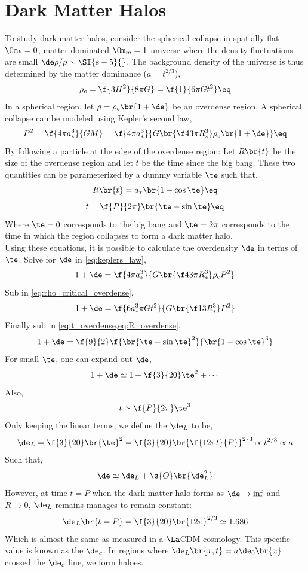 \documentclass{article}
\begin{document}
\section{Dark Matter Halos}
To study dark matter halos, consider the spherical collapse in spatially flat $\Om_k = 0$, matter dominated $\Om_m = 1$ universe where the density fluctuations are small $\de \rho / \rho \sim \SI{e-5}{}$. The background density of the universe is thus determined by the matter dominance ($a = t^{2/3}$),
\[ \rho_c = \f{3 H^2}{8 \pi G} = \f{1}{6 \pi G t^2} \eq \label{eq:rho_critical_overdense}\]
In a spherical region, let $\rho = \rho_c \br{1 + \de}$ be an overdense region. A spherical collapse can be modeled using Kepler's second law,
\[ P^2  = \f{4 \pi a_{*}^3}{GM} = \f{4 \pi a_{*}^3}{G \br{\f43 \pi R_{*}^3} \rho_{c}\br{1 + \de}} \eq \label{eq:keplers_law} \]
By following a particle at the edge of the overdense region: Let $R\br{t}$ be the size of the overdense region and let $t$ be the time since the big bang. These two quantities can be parameterized by a dummy variable $\te$ such that,
\[ R\br{t} = a_{*}\br{1  - \cos \te} \eq \label{eq:R_overdense}\]
\[ t = \f{P}{2 \pi}\br{\te - \sin \te} \eq \label{eq:t_overdense}\]
Where $\te = 0$ corresponds to the big bang and $\te = 2\pi$ corresponds to the time in which the region collapses to form a dark matter halo.\\
Using these equations, it is possible to calculate the overdensity $\de$ in terms of $\te$. Solve for $\de$ in \cref{eq:keplers_law},
\[ 1 + \de = \f{4 \pi a_{*}^3}{G \br{\f43 \pi R_{*}^3} \rho_{c} P^2} \]
Sub in \cref{eq:rho_critical_overdense},
\[ 1 + \de = \f{ 6 a_{*}^3 \pi G t^2}{G \br{\f13 R_{*}^3} P^2} \]
Finally sub in \cref{eq:t_overdense,eq:R_overdense},
\[ 1 + \de = \f{9}{2}\f{\br{\te - \sin \te}^2}{\br{1 - \cos \te}^3} \]
For small $\te$, one can expand out $\de$,
\[ 1 + \de  \simeq 1 + \f{3}{20} \te^2 + \cdots \]
Also,
\[ t \simeq \f{P}{2 \pi} \te^3 \]
Only keeping the linear terms, we define the  $\de_L$ to be,
\[ \de_{L} = \f{3}{20} \br{\te}^2 = \f{3}{20} \br{\f{12 \pi t}{P}}^{2/3} \propto t^{2/3} \propto a \]
Such that,
\[ \de \simeq \de_{L} + \s{O}\br{\de_L^2} \]
However, at time $t = P$ when the dark matter halo forms as $\de \to \inf$ and $R \to 0$, $\de_L$ remains manages to remain constant:
\[ \de_L \br{t = P} = \f{3}{20} \br{12 \pi}^{2/3} \simeq 1.686 \]
Which is almost the same as measured in a $\La$CDM cosmology. This specific value is known as the  $\de_c$. In regions where $\de_{L}\br{x, t} = a \de_{0}\br{x}$ crossed the $\de_{c}$ line, we form haloes.\\
\end{document}
